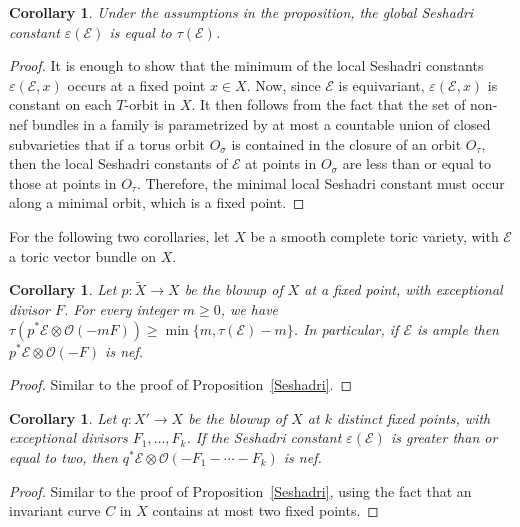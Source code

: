 \documentclass[12pt]{amsart}
\newtheorem{corollary}[lemma]{Corollary}
\theoremstyle{definition}
\theoremstyle{remark}
\begin{document}
\begin{corollary}\label{global_Seshadri}
Under the assumptions in the proposition, the global Seshadri
constant ${\varepsilon}({\mathcal{E}})$ is equal to $\tau({\mathcal{E}})$.
\end{corollary}

\begin{proof}
It is enough to show that the minimum of the local Seshadri constants ${\varepsilon} ({\mathcal{E}}, x)$ occurs at a fixed point $x \in X$.  Now, since ${\mathcal{E}}$ is equivariant, ${\varepsilon}({\mathcal{E}}, x)$ is constant on each $T$-orbit in $X$.  It then follows from the fact that the set of non-nef bundles in a family is parametrized by at most a countable union of closed subvarieties \cite[Proposition~1.4.14]{positivity} that if a torus orbit
 $O_\sigma$ is contained in the closure of an orbit $O_\tau$, then the local Seshadri constants of ${\mathcal{E}}$ at points in $O_\sigma$ are less than or equal to those at points in $O_\tau$.  Therefore, the minimal local Seshadri constant must occur along a minimal orbit, which is a fixed point.
\end{proof}

For the following two corollaries, let $X$ be a smooth complete toric variety, with ${\mathcal{E}}$ a toric vector bundle on $X$.

\begin{corollary}\label{cor1}
Let $p\colon \widetilde X \rightarrow X$ be the blowup of $X$ at a fixed point, with exceptional divisor $F$.  For every integer $m \geq 0$, we have $\tau(p^* {\mathcal{E}} \otimes {\mathcal{O}}(-mF))\geq
\min\{m,\tau({\mathcal{E}}) - m\}$.  In particular, if ${\mathcal{E}}$ is ample then $p^* {\mathcal{E}} \otimes {\mathcal{O}}(-F)$ is nef.
\end{corollary}

\begin{proof}
Similar to the proof of Proposition~\ref{Seshadri}.
\end{proof}

\begin{corollary} \label{cor1'}
Let $q\colon X' \rightarrow X$ be 
the blowup of $X$ at $k$ distinct fixed points, with exceptional divisors $F_1, \ldots, F_k$.  If the Seshadri constant ${\varepsilon}( {\mathcal{E}})$ is greater than or equal to two, then $q^* {\mathcal{E}} \otimes {\mathcal{O}}(-F_1 - \cdots - F_k)$ is nef.
\end{corollary}

\begin{proof}
Similar to the proof of Proposition~\ref{Seshadri}, using the fact that an invariant curve $C$ in $X$ contains at most two fixed points.
\end{proof}
\end{document}

